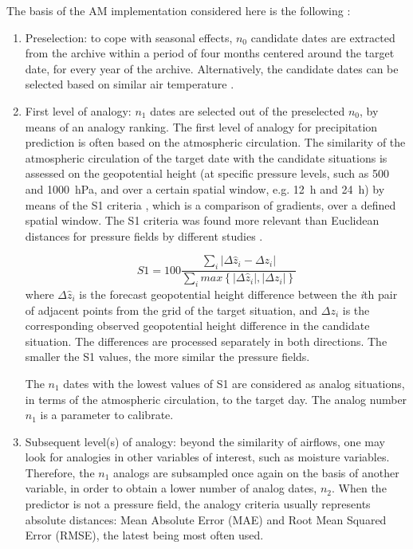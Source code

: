 \documentclass{ametsoc}
\begin{document}
The basis of the AM implementation considered here is the following \citep[same approach as][]{Guilbaud1997, Bontron2005, Marty2012, Horton2012, Radanovics2013, Chardon2014, Dayon2015, BenDaoud2016}:

\begin{enumerate}
	\item Preselection: to cope with seasonal effects, $n_{0}$ candidate dates are extracted from the archive within a period of four months centered around the target date, for every year of the archive. Alternatively, the candidate dates can be selected based on similar air temperature \citep[see][]{BenDaoud2016}.
	
	\item First level of analogy: $n_{1}$ dates are selected out of the preselected $n_{0}$, by means of an analogy ranking. The first level of analogy for precipitation prediction is often based on the atmospheric circulation. The similarity of the atmospheric circulation of the target date with the candidate situations is assessed on the geopotential height (at specific pressure levels, such as 500 and 1000~hPa, and over a certain spatial window, e.g. 12~h and 24~h) by means of the S1 criteria \citep[eq. (\ref{eq:S1}), ][]{Teweles1954, Drosdowsky2003}, which is a comparison of gradients, over a defined spatial window. The S1 criteria was found more relevant than Euclidean distances for pressure fields by different studies \citep{Wilson1980, Woodcock1980, Guilbaud1998, Bontron2004}.
	
	\begin{equation}
	\label{eq:S1}
	S1=100 \frac {\displaystyle \sum_{i} \vert \Delta\hat{z}_{i} - \Delta z_{i} \vert}
	{\displaystyle \sum_{i} max\left\lbrace \vert \Delta\hat{z}_{i} \vert , \vert \Delta z_{i} \vert \right\rbrace }
	\end{equation}
	where $\Delta \hat{z}_{i}$ is the forecast geopotential height difference between the \textit{i}th pair of adjacent points from the grid of the target situation, and $\Delta z_{i}$ is the corresponding observed geopotential height difference in the candidate situation. The differences are processed separately in both directions. The smaller the S1 values, the more similar the pressure fields.
	
	The $n_{1}$ dates with the lowest values of S1 are considered as analog situations, in terms of the atmospheric circulation, to the target day. The analog number $n_{1}$ is a parameter to calibrate.
	
	\item Subsequent level(s) of analogy: beyond the similarity of airflows, one may look for analogies in other variables of interest, such as moisture variables. Therefore, the $n_{1}$ analogs are subsampled once again on the basis of another variable, in order to obtain a lower number of analog dates, $n_{2}$. When the predictor is not a pressure field, the analogy criteria usually represents absolute distances: Mean Absolute Error (MAE) and Root Mean Squared Error (RMSE), the latest being most often used.
	

\end{enumerate}
\end{document}
